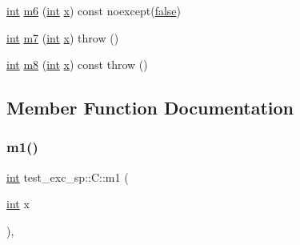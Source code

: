 \begin{DoxyCompactItemize}
\item 
\mbox{\hyperlink{warnings_8h_a74f207b5aa4ba51c3a2ad59b219a423b}{int}} \mbox{\hyperlink{structtest__exc__sp_1_1_c_a4bcaaaccdf04fdeb5ffadc9cd8b8af22}{m6}} (\mbox{\hyperlink{warnings_8h_a74f207b5aa4ba51c3a2ad59b219a423b}{int}} \mbox{\hyperlink{_s_d_l__opengl_8h_ad0e63d0edcdbd3d79554076bf309fd47}{x}}) const noexcept(\mbox{\hyperlink{asdl_8h_af6a258d8f3ee5206d682d799316314b1ae9de385ef6fe9bf3360d1038396b884c}{false}})
\item 
\mbox{\hyperlink{warnings_8h_a74f207b5aa4ba51c3a2ad59b219a423b}{int}} \mbox{\hyperlink{structtest__exc__sp_1_1_c_a0d729ce7721e3cc0c75e686d9683bec3}{m7}} (\mbox{\hyperlink{warnings_8h_a74f207b5aa4ba51c3a2ad59b219a423b}{int}} \mbox{\hyperlink{_s_d_l__opengl_8h_ad0e63d0edcdbd3d79554076bf309fd47}{x}})  throw ()
\item 
\mbox{\hyperlink{warnings_8h_a74f207b5aa4ba51c3a2ad59b219a423b}{int}} \mbox{\hyperlink{structtest__exc__sp_1_1_c_a1b4efac93c03723fff1e17f4d07d165e}{m8}} (\mbox{\hyperlink{warnings_8h_a74f207b5aa4ba51c3a2ad59b219a423b}{int}} \mbox{\hyperlink{_s_d_l__opengl_8h_ad0e63d0edcdbd3d79554076bf309fd47}{x}}) const  throw ()
\end{DoxyCompactItemize}


\subsection{Member Function Documentation}
\mbox{\label{structtest__exc__sp_1_1_c_a6d40a55c112d67cb1e7eed95998fee66}} 
\subsubsection{\texorpdfstring{m1()}{m1()}}
{\footnotesize\ttfamily \mbox{\hyperlink{warnings_8h_a74f207b5aa4ba51c3a2ad59b219a423b}{int}} test\+\_\+exc\+\_\+sp\+::\+C\+::m1 (\begin{DoxyParamCaption}\item[{\mbox{\hyperlink{warnings_8h_a74f207b5aa4ba51c3a2ad59b219a423b}{int}}}]{x }\end{DoxyParamCaption})\hspace{0.3cm}{\ttfamily [inline]}, {\ttfamily [noexcept]}}

\mbox{\label{structtest__exc__sp_1_1_c_aecf03f1641a2c17d698a2d9715919abd}} 

